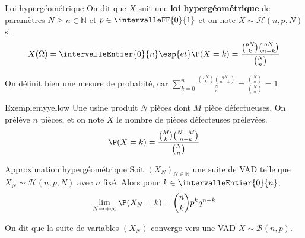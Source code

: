     \begin{defi}{Loi hypergéométrique}{}
        On dit que $X$ suit une \textbf{loi hypergéométrique} de paramètres $N \geq n \in \mathbb{N}$ et $p \in \intervalleFF{0}{1}$ et on note $X \sim \mathcal{H}(n,p,N)$ si 
        \[ X(\Omega) = \intervalleEntier{0}{n} \esp{et} \P(X=k) = \frac{\binom{pN}{k} \binom{qN}{n-k}}{\binom{N}{n}} \]   
    \end{defi}

    On définit bien une mesure de probabité, car $\sum_{k = 0}^n \frac{\binom{pN}{k} \binom{qN}{n-k}}{\frac{N}{n}} = \frac{\binom{N}{n}}{\binom{N}{n}} = 1$.

    \begin{omed}{Exemple}{myyellow}
        Une usine produit $N$ pièces dont $M$ pièce défectueuses. On prélève $n$ pièces, et on note $X$ le nombre de pièces défecteuses prélevées. 
        \[ \P(X = k) = \frac{\binom{M}{k} \binom{N-M}{n-k}}{\binom{N}{n}} \]    
    \end{omed}

    \begin{prop}{Approximation hypergéométrique}{}
        Soit $(X_N)_{N \in \mathbb{N}}$ une suite de VAD telle que $X_N \sim \mathcal{H}(n, p, N)$ avec $n$ fixé. Alors pour $k \in \intervalleEntier{0}{n}$, 
        \[ \lim_{N \to +\infty} \P(X_N = k) = \binom{n}{k} p^k q^{n-k} \]   
    \end{prop}

    On dit que la suite de variables $(X_N)$ converge vers une VAD $X \sim \mathcal{B}(n,p)$.

